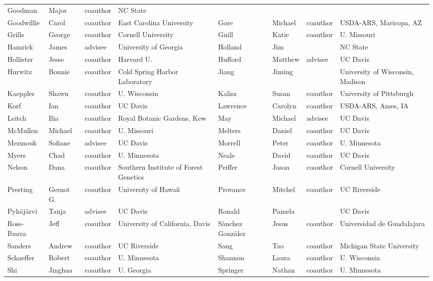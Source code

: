 \documentclass[11pt]{article}
\begin{document}
\begin{tiny}
\begin{tabular}{ l l l l l l l l }
Goodman & Major & coauthor   & NC State \\ 
Goodwillie & Carol & coauthor   & East Carolina University &
Gore & Michael & coauthor   & USDA-ARS, Maricopa, AZ \\ 
Grills & George & coauthor   & Cornell University &
Guill & Katie & coauthor   & U. Missouri \\ 
Hamrick &  James & advisee & University of Georgia &
Holland & Jim &    & NC State \\ 
Hollister &  Jesse & coauthor   & Harvard U. &
Hufford & Matthew &  advisee & UC Davis \\ 
Hurwitz & Bonnie & coauthor   & Cold Spring Harbor Laboratory &
Jiang & Jiming &    & University of Wisconsin, Madison \\ 
Kaeppler & Shawn & coauthor   & U. Wisconsin &
Kalisz &  Susan & coauthor   & University of Pittsburgh \\ 
Korf & Ian & coauthor & UC Davis &
Lawrence & Carolyn & coauthor   & USDA-ARS, Ames, IA \\ 
Leitch &  Ilia & coauthor   & Royal Botanic Gardens, Kew &
May &  Michael & advisee & UC Davis \\ 
McMullen & Michael & coauthor   & U. Missouri &
Melters & Daniel & coauthor & UC Davis \\ 
Mezmouk & Sofiane & advisee & UC Davis &
Morrell &  Peter & coauthor   & U. Minnesota \\ 
Myers & Chad & coauthor   & U. Minnesota &
Neale & David & coauthor   & UC Davis \\ 
Nelson & Dana & coauthor   & Southern Institute of Forest Genetics &
Peiffer & Jason & coauthor   & Cornell University \\ 
Presting & Gernot G. & coauthor   & University of Hawaii & 
Provance &  Mitchel & coauthor   & UC Riverside \\ 
Pyh\"aj\"arvi  & Tanja &   advisee & UC Davis &
Ronald & Pamela &  & UC Davis \\ 
Ross-Ibarra & Jeff & coauthor   & University of California, Davis &
S\`anchez Gonz\`alez & Jesus & coauthor   & Universidad de Guadalajara \\ 
Sanders &  Andrew & coauthor   & UC Riverside &
Sang &  Tao & coauthor   & Michigan State University \\ 
Schaeffer & Robert & coauthor   & U. Minnesota &
Shannon & Laura & coauthor   & U. Wisconsin \\ 
Shi & Jinghua & coauthor   & U. Georgia &
Springer & Nathan & coauthor   & U. Minnesota \\ 

\end{tabular}
\end{tiny}
\end{document}
